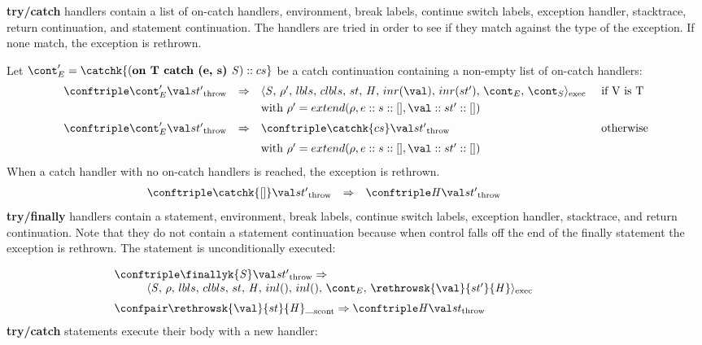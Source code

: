 \documentclass{article}
\begin{document}
\noindent
\textbf{try/catch} handlers contain a list of on-catch handlers, environment, break labels, continue switch labels, exception handler, stacktrace, return continuation, and statement continuation. The handlers are tried in order to see if they match against the type of the exception. If none match, the exception is rethrown.

\noindent
Let $\econt' = \catchk{(\textbf{on T catch (e, s) }\stmt) :: cs}$ be a catch continuation containing a non-empty list of on-catch handlers:
\[
  \begin{array}{lcll}
	\throwconf{\econt'}{\val}{\strace'}
	& \Rightarrow &
	\execconf{\stmt}{\env'}{\lbls}{\clbls}{\handler}{inr(\val)}{inr(\strace')}{\econt}{\scont}
	&\textrm{ if V is T}\\[1mm]

	&&\textrm{with } \env' = extend(\env, e :: s :: [], \val :: \strace' :: [])\\[2mm]

	\throwconf{\econt'}{\val}{\strace'}
	& \Rightarrow &
	\throwconf{\catchk{cs}}{\val}{\strace'}	&\textrm{ otherwise}\\[2mm]
	&&\textrm{with } \env' = extend(\env, e :: s :: [], \val :: \strace' :: [])
  \end{array}
\]
\noindent
When a catch handler with no on-catch handlers is reached, the exception is rethrown.
\[
  \begin{array}{lcll}
	\throwconf{\catchk{[]}}{\val}{\strace'}
	& \Rightarrow &
	\throwconf{\handler}{\val}{\strace'}\hspace{20mm}
  \end{array}
\]
\noindent
\textbf{try/finally} handlers contain a statement, environment, break labels, continue switch labels, exception handler, stacktrace, and return continuation. Note that they do not contain a statement continuation because when control falls off the end of the finally statement the exception is rethrown. The statement is unconditionally executed:

\[
  \begin{array}{lcl}
	\throwconf{\finallyk{\stmt}}{\val}{\strace'}
	\Rightarrow \\
	\hspace{10mm}\execconf{\stmt}{\env}{\lbls}{\clbls}{\handler}{inl()}{inl()}{\econt}{\rethrowsk{\val}{\strace'}{\handler}}\hspace{20mm}\\[2mm]

	\scontconf{\rethrowsk{\val}{\strace}{\handler}}{\_}
	\Rightarrow \throwconf{\handler}{\val}{\strace}

  \end{array}
\]
\noindent
\textbf{try/catch} statements execute their body with a new handler:
\end{document}
